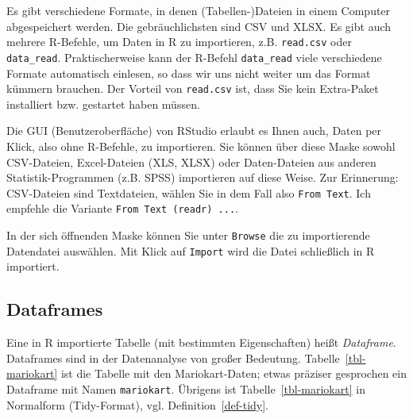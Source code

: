 \documentclass[
  letterpaper,
  twoside,
  open=any]{scrbook}
\theoremstyle{definition}
\theoremstyle{definition}
\theoremstyle{definition}
\theoremstyle{remark}
\begin{document}
\begin{figure}


\caption{\label{fig-upload-to-posit-cloud}}

\end{figure}%

Es gibt verschiedene Formate, in denen (Tabellen-)Dateien in einem
Computer abgespeichert werden. Die gebräuchlichsten sind CSV und XLSX.
Es gibt auch mehrere R-Befehle, um Daten in R zu importieren, z.B.
\texttt{read.csv} oder \texttt{data\_read}. Praktischerweise kann der
R-Befehl \texttt{data\_read} viele verschiedene Formate automatisch
einlesen, so dass wir uns nicht weiter um das Format kümmern brauchen.
Der Vorteil von \texttt{read.csv} ist, dass Sie kein Extra-Paket
installiert bzw. gestartet haben müssen.

Die GUI (Benutzeroberfläche) von RStudio erlaubt es Ihnen auch, Daten
per Klick, also ohne R-Befehle, zu importieren. Sie können über diese
Maske sowohl CSV-Dateien, Excel-Dateien (XLS, XLSX) oder Daten-Dateien
aus anderen Statistik-Programmen (z.B. SPSS) importieren auf diese
Weise. Zur Erinnerung: CSV-Dateien sind Textdateien, wählen Sie in dem
Fall also \texttt{From\ Text}. Ich empfehle die Variante
\texttt{From\ Text\ (readr)\ ...}.

In der sich öffnenden Maske können Sie unter \texttt{Browse} die zu
importierende Datendatei auswählen. Mit Klick auf \texttt{Import} wird
die Datei schließlich in R importiert.

\subsection{Dataframes}\label{dataframes}

Eine in R importierte Tabelle (mit bestimmten Eigenschaften) heißt
\emph{Dataframe}. Dataframes sind in der Datenanalyse von großer
Bedeutung. Tabelle~\ref{tbl-mariokart} ist die Tabelle mit den
Mariokart-Daten; etwas präziser gesprochen ein Dataframe mit Namen
\texttt{mariokart}. Übrigens ist Tabelle~\ref{tbl-mariokart} in
Normalform (Tidy-Format), vgl. Definition~\ref{def-tidy}.
\end{document}
